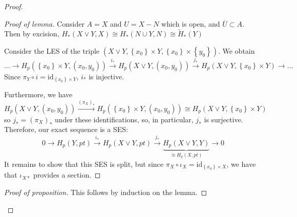 \documentclass[reqno]{amsart}
\theoremstyle{definition}
\theoremstyle{remark}
\newcommand{\id}{{\mathrm{id}}}
\begin{document}
\begin{proof}
\begin{enumerate}
                \begin{proof}[Proof of lemma]
                    Consider $A = X$ and
                    $U = X - N$ which is open, and
                    $\overline{U} \subset A$. Then by
                    excision,
                    $H_* \left( X \vee Y, X \right) 
                    \cong H_*\left( N \cup Y, N \right) 
                    \cong \tilde{H}_*\left( Y \right) $

                    Consider the LES of the triple
                    $\left( X \vee Y,
                    \left\{ x_0 \right\} \times Y,
                \left\{ x_0 \right\} \times 
            \left\{ y_0 \right\} \right) $. We obtain
            \[
            \ldots \to 
            H_p\left( \left\{ x_0 \right\} \times Y,
            \left( x_0,y_0 \right) \right)
            \stackrel{i_*}{\to}
            H_p\left( X \vee Y, \left( x_0,y_0 \right)  \right) 
            \stackrel{j_*}{\to} H_p\left( X \vee Y,
            \left\{ x_0 \right\} \times Y \right) \to \ldots
            \] 
            Since $\pi_Y \circ i = \id_{
            \left\{ x_0 \right\} \times Y} $, 
            $i_*$ is injective.

            Furthermore, we have
            \[
            H_p\left( X \vee Y, 
            \left( x_0, y_0 \right) \right) 
            \stackrel{\left( \pi_X \right)_* }{\to } 
            H_p \left( \left\{ x_0 \right\} \times Y,
            \left( x_0, y_0 \right) \right) 
            \cong H_p\left( X \vee Y , 
            \left\{ x_0 \right\} \times Y \right) 
            \] 
            so $j_* = \left( \pi_X \right)_*$ under these
            identifications, so, in particular, 
            $j_*$ is surjective. Therefore, our exact sequence
            is a SES:
            \[
            0 \to  H_p\left( Y, pt \right)
            \stackrel{i_*}{\to }
            H_p \left( X \vee Y, pt \right) 
            \stackrel{j_*}{\to }
            \underbrace{H_p \left( X \vee Y, Y \right)}_{
            \cong H_p\left( X, pt \right) } \to 0
            \] 
            It remains to show that this SES is split, but
            since
            $\pi_X \circ \iota_{X} = 
            \id_{\left\{ x_0 \right\} \times X}$,
            we have that $\iota_{X*}$ provides a section.

        \end{proof}

        \begin{proof}[Proof of proposition]
            This follows by induction on the lemma.
        \end{proof}


\end{enumerate}
\end{proof}
\end{document}
